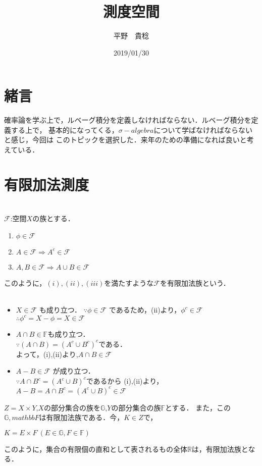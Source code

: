 \documentclass[11pt, a4paper, dvipdfmx]{jsarticle}
\title{測度空間}
\author{平野　貴稔}
\date{2019/01/30}
\theoremstyle{definition}
\newcommand{\F}{\mathcal{F}}
\begin{document}
\maketitle
\setcounter{section}{0}
\section{緒言}
確率論を学ぶ上で，ルベーグ積分を定義しなければならない．ルベーグ積分を定義する上で，
基本的になってくる，$\sigma-algebra$について学ばなければならないと感じ，今回は
このトピックを選択した．来年のための準備になれば良いと考えている．




\section{有限加法測度}
\\
$\F$:空間$X$の族とする．
\begin{enumerate}
\renewcommand{\labelenumi}{(\roman{enumi})}
\item $\phi \in \F$
\item $A \in \F\Rightarrow A^{c} \in \F$
\item $A,B \in \F \Rightarrow A \cup B \in \F$
\end{enumerate}
このように，$(i),(ii),(iii)$を満たすような$\F$を有限加法族という．\\
\\
\begin{itemize}
\item $X \in \F$ も成り立つ．
$\because \phi \in \F$ であるため，(ii)より，$\phi^{c} \in \F$\\
$\therefore \phi^{c} = X-\phi = X \in \F$
\\
\item $A \cap B \in \mathbb{F}$も成り立つ．\\
$\because (A \cap B) = (A^{c} \cup B^{c})^{c} $である．　\\
よって，(i),(ii)より,$A\cap B \in \F$
\\
\item $A - B \in \F$  が成り立つ．\\
$\because A\cap B^{c} = (A^{c}\cup B)^{c}$であるから
(i),(ii)より，$A-B = A \cap B^{c} = (A^{c}\cup B)^c \in \F$

\end{itemize}

\Theorem $Z = X \times Y$,$X$の部分集合の族を$\mathbb{G}$,$Y$の部分集合の族$\mathbb{F}$とする．
また，この$\mathbb{G},mathbb{F}$は有限加法族である．今，$K \in Z$で，
\begin{center}
$K = E \times F~ (E \in \mathbb{G},F \in \mathbb{F}) $
\end{center}
このように，集合の有限個の直和として表されるもの全体$\mathbb{R}$は，有限加法族となる．\\
\end{document}
